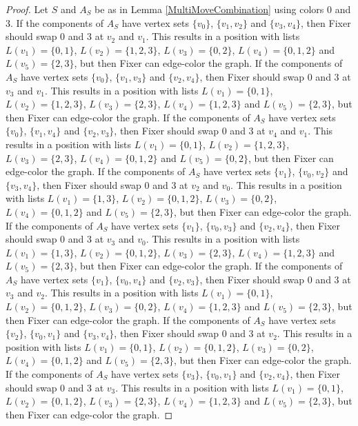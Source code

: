 \documentclass[12pt]{amsart}
\theoremstyle{plain}
\theoremstyle{definition}
\theoremstyle{remark}
\begin{document}
\begin{proof}
Let $S$ and $A_S$ be as in Lemma \ref{MultiMoveCombination} using colors $0$ and $3$. If the components of $A_S$ have vertex sets $\{v_0\}$, $\{v_1, v_2\}$ and $\{v_3, v_4\}$, then Fixer should swap 0 and 3 at $v_2$ and $v_1$. This results in a position with lists $L(v_1) = \{0, 1\}$, $L(v_2) = \{1, 2, 3\}$, $L(v_3) = \{0, 2\}$, $L(v_4) = \{0, 1, 2\}$ and $L(v_5) = \{2, 3\}$, but then Fixer can edge-color the graph.
If the components of $A_S$ have vertex sets $\{v_0\}$, $\{v_1, v_3\}$ and $\{v_2, v_4\}$, then Fixer should swap 0 and 3 at $v_3$ and $v_1$. This results in a position with lists $L(v_1) = \{0, 1\}$, $L(v_2) = \{1, 2, 3\}$, $L(v_3) = \{2, 3\}$, $L(v_4) = \{1, 2, 3\}$ and $L(v_5) = \{2, 3\}$, but then Fixer can edge-color the graph.
If the components of $A_S$ have vertex sets $\{v_0\}$, $\{v_1, v_4\}$ and $\{v_2, v_3\}$, then Fixer should swap 0 and 3 at $v_4$ and $v_1$. This results in a position with lists $L(v_1) = \{0, 1\}$, $L(v_2) = \{1, 2, 3\}$, $L(v_3) = \{2, 3\}$, $L(v_4) = \{0, 1, 2\}$ and $L(v_5) = \{0, 2\}$, but then Fixer can edge-color the graph.
If the components of $A_S$ have vertex sets $\{v_1\}$, $\{v_0, v_2\}$ and $\{v_3, v_4\}$, then Fixer should swap 0 and 3 at $v_2$ and $v_0$. This results in a position with lists $L(v_1) = \{1, 3\}$, $L(v_2) = \{0, 1, 2\}$, $L(v_3) = \{0, 2\}$, $L(v_4) = \{0, 1, 2\}$ and $L(v_5) = \{2, 3\}$, but then Fixer can edge-color the graph.
If the components of $A_S$ have vertex sets $\{v_1\}$, $\{v_0, v_3\}$ and $\{v_2, v_4\}$, then Fixer should swap 0 and 3 at $v_3$ and $v_0$. This results in a position with lists $L(v_1) = \{1, 3\}$, $L(v_2) = \{0, 1, 2\}$, $L(v_3) = \{2, 3\}$, $L(v_4) = \{1, 2, 3\}$ and $L(v_5) = \{2, 3\}$, but then Fixer can edge-color the graph.
If the components of $A_S$ have vertex sets $\{v_1\}$, $\{v_0, v_4\}$ and $\{v_2, v_3\}$, then Fixer should swap 0 and 3 at $v_3$ and $v_2$. This results in a position with lists $L(v_1) = \{0, 1\}$, $L(v_2) = \{0, 1, 2\}$, $L(v_3) = \{0, 2\}$, $L(v_4) = \{1, 2, 3\}$ and $L(v_5) = \{2, 3\}$, but then Fixer can edge-color the graph.
If the components of $A_S$ have vertex sets $\{v_2\}$, $\{v_0, v_1\}$ and $\{v_3, v_4\}$, then Fixer should swap 0 and 3 at $v_2$. This results in a position with lists $L(v_1) = \{0, 1\}$, $L(v_2) = \{0, 1, 2\}$, $L(v_3) = \{0, 2\}$, $L(v_4) = \{0, 1, 2\}$ and $L(v_5) = \{2, 3\}$, but then Fixer can edge-color the graph.
If the components of $A_S$ have vertex sets $\{v_3\}$, $\{v_0, v_1\}$ and $\{v_2, v_4\}$, then Fixer should swap 0 and 3 at $v_3$. This results in a position with lists $L(v_1) = \{0, 1\}$, $L(v_2) = \{0, 1, 2\}$, $L(v_3) = \{2, 3\}$, $L(v_4) = \{1, 2, 3\}$ and $L(v_5) = \{2, 3\}$, but then Fixer can edge-color the graph.

\end{proof}
\end{document}
